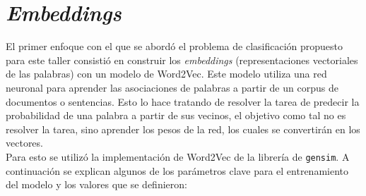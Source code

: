\section{\textit{Embeddings}}

El primer enfoque con el que se abordó el problema de clasificación propuesto para este taller consistió en construir los \textit{embeddings} (representaciones vectoriales de las palabras) con un modelo de Word2Vec. Este modelo utiliza una red neuronal para aprender las asociaciones de palabras a partir de un corpus de documentos o sentencias. Esto lo hace tratando de resolver la tarea de predecir la probabilidad de una palabra a partir de sus vecinos, el objetivo como tal no es resolver la tarea, sino aprender los pesos de la red, los cuales se convertirán en los vectores. \\

Para esto se utilizó la implementación de Word2Vec de la librería de \texttt{gensim}. A continuación se explican algunos de los parámetros clave para el entrenamiento del modelo y los valores que se definieron:


